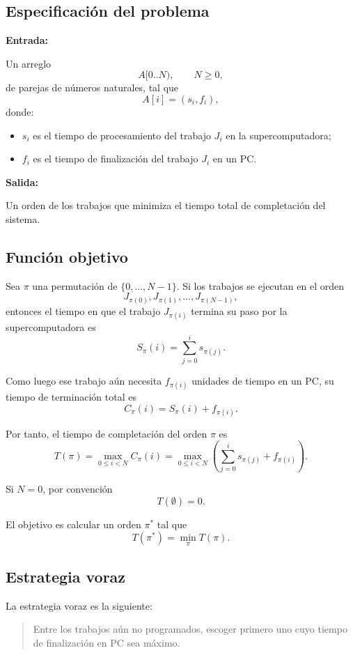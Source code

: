\documentclass[11pt]{article}
\begin{document}
\subsection*{Especificación del problema}

\textbf{Entrada:}

Un arreglo
\[
A[0..N), \qquad N \geq 0,
\]
de parejas de números naturales, tal que
\[
A[i] = (s_i,f_i),
\]
donde:
\begin{itemize}[nosep]
    \item \(s_i\) es el tiempo de procesamiento del trabajo \(J_i\) en la supercomputadora;
    \item \(f_i\) es el tiempo de finalización del trabajo \(J_i\) en un PC.
\end{itemize}

\textbf{Salida:}

Un orden de los trabajos que minimiza el tiempo total de completación del sistema.

\subsection*{Función objetivo}

Sea \(\pi\) una permutación de \(\{0,\dots,N-1\}\). Si los trabajos se ejecutan en el orden
\[
J_{\pi(0)}, J_{\pi(1)}, \dots, J_{\pi(N-1)},
\]
entonces el tiempo en que el trabajo \(J_{\pi(i)}\) termina su paso por la supercomputadora es
\[
S_{\pi}(i)=\sum_{j=0}^{i} s_{\pi(j)}.
\]

Como luego ese trabajo aún necesita \(f_{\pi(i)}\) unidades de tiempo en un PC, su tiempo
de terminación total es
\[
C_{\pi}(i)=S_{\pi}(i)+f_{\pi(i)}.
\]

Por tanto, el tiempo de completación del orden \(\pi\) es
\[
T(\pi)=\max_{0\leq i<N} C_{\pi}(i)
      =\max_{0\leq i<N}\left(\sum_{j=0}^{i} s_{\pi(j)} + f_{\pi(i)}\right).
\]

Si \(N=0\), por convención
\[
T(\emptyset)=0.
\]

El objetivo es calcular un orden \(\pi^\ast\) tal que
\[
T(\pi^\ast)=\min_{\pi} T(\pi).
\]

\subsection*{Estrategia voraz}

La estrategia voraz es la siguiente:

\begin{quote}
Entre los trabajos aún no programados, escoger primero uno cuyo tiempo de
finalización en PC sea máximo.
\end{quote}
\end{document}
